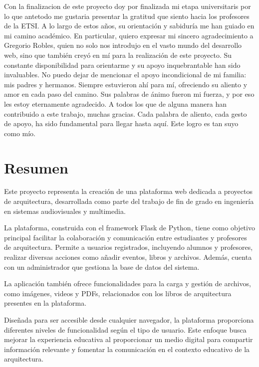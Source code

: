 \documentclass[a4paper, 12pt]{book}
\begin{document}
Con la finalizacion de este proyecto doy por finalizada mi etapa universitaris por lo que antetodo me gustaria presentar la gratitud que siento hacia los profesores de la ETSI. A lo largo de estos años, su orientación y sabiduría me han guiado en mi camino académico. 
En particular, quiero expresar mi sincero agradecimiento a Gregorio Robles, quien no solo nos introdujo en el vasto mundo del desarrollo web, sino que también creyó en mí para la realización de este proyecto. Su constante disponibilidad para orientarme y su apoyo inquebrantable han sido invaluables.
No puedo dejar de mencionar el apoyo incondicional de mi familia: mis padres y hermanos. Siempre estuvieron ahí para mí, ofreciendo su aliento y amor en cada paso del camino. Sus palabras de ánimo fueron mi fuerza, y por eso les estoy eternamente agradecido.
A todos los que de alguna manera han contribuido a este trabajo, muchas gracias. Cada palabra de aliento, cada gesto de apoyo, ha sido fundamental para llegar hasta aquí. Este logro es tan suyo como mío.


\chapter*{Resumen}

Este proyecto representa la creación de una plataforma web dedicada a proyectos de arquitectura, 
desarrollada como parte del trabajo de fin de grado en ingeniería en sistemas audiovisuales y multimedia. 

La plataforma, construida con el framework Flask de Python, tiene como objetivo principal facilitar la 
colaboración y comunicación entre estudiantes y profesores de arquitectura. Permite a usuarios registrados, 
incluyendo alumnos y profesores, realizar diversas acciones como añadir eventos, libros y archivos. 
Además, cuenta con un administrador que gestiona la base de datos del sistema. 

La aplicación también ofrece funcionalidades para la carga y gestión de archivos, como imágenes, videos y PDFs, 
relacionados con los libros de arquitectura presentes en la plataforma. 

Diseñada para ser accesible desde cualquier navegador, la plataforma proporciona diferentes niveles 
de funcionalidad según el tipo de usuario. Este enfoque busca mejorar la experiencia educativa al 
proporcionar un medio digital para compartir información relevante y fomentar la comunicación en el
 contexto educativo de la arquitectura.
\end{document}
